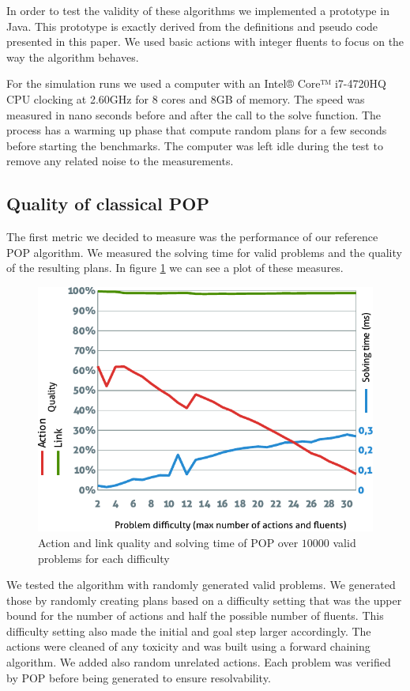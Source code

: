 \documentclass[]{article}
\begin{document}
In order to test the validity of these algorithms we implemented a
prototype in Java. This prototype is exactly derived from the
definitions and pseudo code presented in this paper. We used basic
actions with integer fluents to focus on the way the algorithm behaves.

For the simulation runs we used a computer with an Intel® Core™
i7-4720HQ CPU clocking at 2.60GHz for 8 cores and 8GB of memory. The
speed was measured in nano seconds before and after the call to the
solve function. The process has a warming up phase that compute random
plans for a few seconds before starting the benchmarks. The computer was
left idle during the test to remove any related noise to the
measurements.

\subsection{Quality of classical POP}\label{quality-of-classical-pop}

The first metric we decided to measure was the performance of our
reference POP algorithm. We measured the solving time for valid problems
and the quality of the resulting plans. In figure \ref{fig:quality} we
can see a plot of these measures.

\begin{figure}[htbp]
\centering
\includegraphics{graphics/quality.pdf}
\caption{Action and link quality and solving time of POP over \(10 000\)
valid problems for each difficulty\label{fig:quality}}
\end{figure}

We tested the algorithm with randomly generated valid problems. We
generated those by randomly creating plans based on a difficulty setting
that was the upper bound for the number of actions and half the possible
number of fluents. This difficulty setting also made the initial and
goal step larger accordingly. The actions were cleaned of any toxicity
and was built using a forward chaining algorithm. We added also random
unrelated actions. Each problem was verified by POP before being
generated to ensure resolvability.
\end{document}
